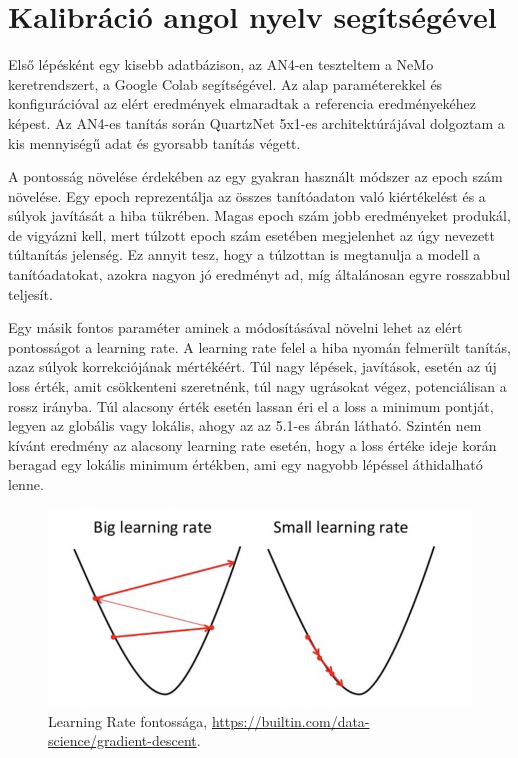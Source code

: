 \section{Kalibráció angol nyelv segítségével}

Első lépésként egy kisebb adatbázison, az AN4-en teszteltem a NeMo keretrendszert, a Google Colab segítségével. Az alap paraméterekkel és konfigurációval az elért eredmények elmaradtak a referencia eredményekéhez képest. Az AN4-es tanítás során QuartzNet 5x1-es architektúrájával dolgoztam a kis mennyiségű adat és gyorsabb tanítás végett.

A pontosság növelése érdekében az egy gyakran használt módszer az epoch szám növelése. Egy epoch reprezentálja az összes tanítóadaton való kiértékelést és a súlyok javítását a hiba tükrében. Magas epoch szám jobb eredményeket produkál, de vigyázni kell, mert túlzott epoch szám esetében megjelenhet az úgy nevezett túltanítás jelenség. Ez annyit tesz, hogy a túlzottan is megtanulja a modell a tanítóadatokat, azokra nagyon jó eredményt ad, míg általánosan egyre rosszabbul teljesít.

Egy másik fontos paraméter aminek a módosításával növelni lehet az elért pontosságot a learning rate. A learning rate felel a hiba nyomán felmerült tanítás, azaz súlyok korrekciójának mértékéért. Túl nagy lépések, javítások, esetén az új loss érték, amit csökkenteni szeretnénk, túl nagy ugrásokat végez, potenciálisan a rossz irányba. Túl alacsony érték esetén lassan éri el a loss a minimum pontját, legyen az globális vagy lokális, ahogy az az 5.1-es ábrán látható. Szintén nem kívánt eredmény az alacsony learning rate esetén, hogy a loss értéke ideje korán beragad egy lokális minimum értékben, ami egy nagyobb lépéssel áthidalható lenne.

\begin{figure}[!ht]
\centering
\includegraphics[width=150mm, keepaspectratio]{figures/gradient-descent-learning-rate.png}
\caption{Learning Rate fontossága, \url{https://builtin.com/data-science/gradient-descent}.}
\end{figure}

